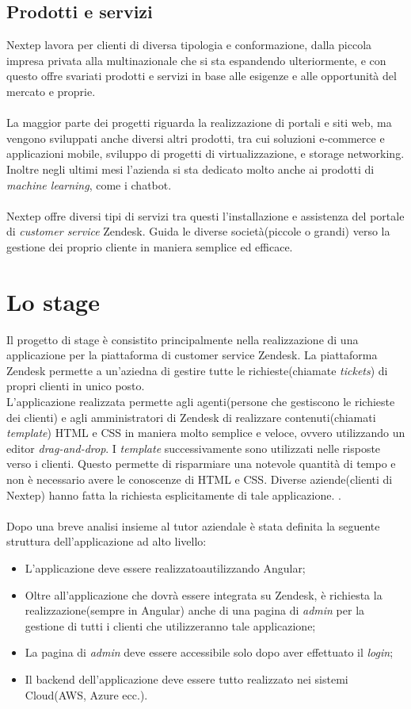 \subsection{Prodotti e servizi}
Nextep lavora per clienti di diversa tipologia e conformazione, dalla piccola impresa
privata alla multinazionale che si sta espandendo ulteriormente, e con questo offre
svariati prodotti e servizi in base alle esigenze e alle opportunità del mercato e proprie. 
\\ \\La maggior parte dei progetti riguarda la realizzazione di portali e siti web, ma vengono
sviluppati anche diversi altri prodotti, tra cui soluzioni e-commerce e applicazioni
mobile, sviluppo di progetti di virtualizzazione, e storage networking. Inoltre negli ultimi mesi l'azienda si sta dedicato molto anche ai prodotti di \emph{machine learning}, come i chatbot. \\ \\Nextep offre diversi tipi di servizi tra questi l'installazione e assistenza del portale di \emph{customer service} Zendesk. Guida le diverse società(piccole o grandi) verso la gestione dei proprio cliente in maniera semplice ed efficace. 

\section{Lo stage}
Il progetto di stage è consistito principalmente nella realizzazione di una applicazione per la piattaforma di customer service Zendesk. La piattaforma Zendesk permette a un'aziedna di gestire tutte le richieste(chiamate \emph{tickets}) di propri clienti in unico posto. \\ L'applicazione realizzata permette agli agenti(persone che gestiscono le richieste dei clienti) e agli amministratori di Zendesk di realizzare contenuti(chiamati \emph{template}) HTML e CSS in maniera molto semplice e veloce, ovvero utilizzando un editor \emph{drag-and-drop}. I \emph{template} successivamente sono utilizzati nelle risposte verso i clienti. Questo permette di risparmiare una notevole quantità di tempo e non è necessario avere le conoscenze di HTML e CSS. Diverse aziende(clienti di Nextep) hanno fatta la richiesta esplicitamente di tale applicazione. .
\\
\\
Dopo una breve analisi insieme al tutor aziendale è stata definita la seguente struttura dell'applicazione ad alto livello: 
\begin{itemize}
	\item L'applicazione deve essere realizzatoautilizzando Angular; 
	\item Oltre all'applicazione che dovrà essere integrata su Zendesk, è richiesta la realizzazione(sempre in Angular) anche di una pagina di \emph{admin} per la gestione di tutti i clienti che utilizzeranno tale applicazione;
	\item La pagina di \emph{admin} deve essere accessibile solo dopo aver effettuato il \emph{login};
	\item Il backend dell'applicazione deve essere tutto realizzato nei sistemi Cloud(AWS, Azure ecc.).
\end{itemize} 
